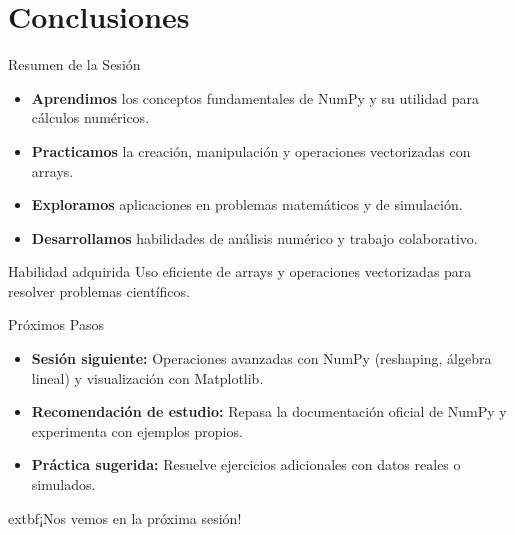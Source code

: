 \documentclass[10pt]{beamer}
\begin{document}

\section{Conclusiones}

\begin{frame}{Resumen de la Sesión}
  \begin{itemize}
    \item \textbf{Aprendimos} los conceptos fundamentales de NumPy y su utilidad para cálculos numéricos.
    \item \textbf{Practicamos} la creación, manipulación y operaciones vectorizadas con arrays.
    \item \textbf{Exploramos} aplicaciones en problemas matemáticos y de simulación.
    \item \textbf{Desarrollamos} habilidades de análisis numérico y trabajo colaborativo.
  \end{itemize}
  \begin{block}{Habilidad adquirida}
    Uso eficiente de arrays y operaciones vectorizadas para resolver problemas científicos.
  \end{block}
\end{frame}

\begin{frame}{Próximos Pasos}
  \begin{itemize}
    \item \textbf{Sesión siguiente:} Operaciones avanzadas con NumPy (reshaping, álgebra lineal) y visualización con Matplotlib.
    \item \textbf{Recomendación de estudio:} Repasa la documentación oficial de NumPy y experimenta con ejemplos propios.
    \item \textbf{Práctica sugerida:} Resuelve ejercicios adicionales con datos reales o simulados.
  \end{itemize}
  \begin{center}
    	extbf{¡Nos vemos en la próxima sesión!}
  \end{center}
\end{frame}
\end{document}
